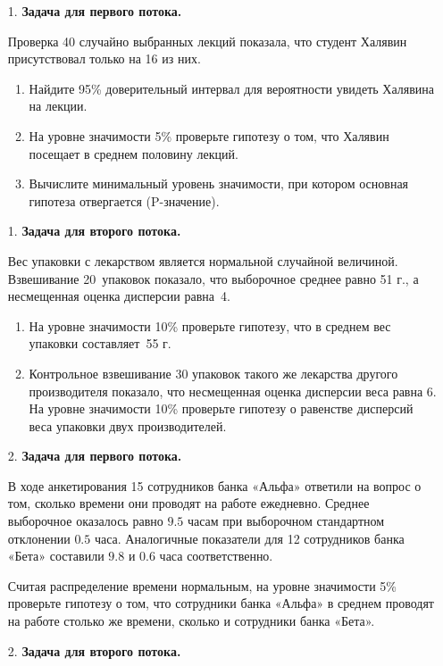 \begin{enumerate}

\item[1.] \textbf{Задача для первого потока.}

Проверка 40 случайно выбранных лекций показала, что студент Халявин присутствовал
только на 16 из них.
\begin{enumerate}
\item Найдите 95\% доверительный интервал для вероятности увидеть Халявина на лекции.
\item На уровне значимости 5\% проверьте гипотезу о том, что Халявин посещает
в среднем половину лекций.
\item Вычислите минимальный уровень значимости, при котором основная гипотеза
отвергается (P-значение).
\end{enumerate}

\item[1.] \textbf{Задача для второго потока.}

Вес упаковки с лекарством является нормальной случайной величиной.
Взвешивание 20~упаковок показало, что выборочное среднее равно 51 г., а
несмещенная оценка дисперсии равна~4.
\begin{enumerate}
\item На уровне значимости 10\% проверьте гипотезу, что в среднем вес упаковки
составляет~55 г.
\item Контрольное взвешивание 30 упаковок такого же лекарства другого производителя
показало, что несмещенная оценка дисперсии веса равна 6. На уровне значимости 10\%
проверьте гипотезу о равенстве дисперсий веса упаковки двух производителей.
\end{enumerate}

\item[2.] \textbf{Задача для первого потока.}

В ходе анкетирования 15 сотрудников банка «Альфа» ответили на вопрос о том,
сколько времени они проводят на работе ежедневно. Среднее выборочное оказалось
равно $9.5$ часам при выборочном стандартном отклонении $0.5$ часа. Аналогичные
показатели для 12 сотрудников банка «Бета» составили $9.8$ и $0.6$ часа соответственно.

Считая распределение времени нормальным, на уровне значимости 5\% проверьте
гипотезу о том, что сотрудники банка «Альфа» в среднем проводят на работе столько
же времени, сколько и сотрудники банка «Бета».

\item[2.] \textbf{Задача для второго потока.}


\end{enumerate}
